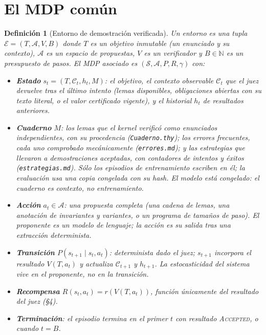 \documentclass[11pt,a4paper]{article}
\newtheorem{definition}{Definición}
\begin{document}
\section{El MDP común}

\begin{definition}[Entorno de demostración verificada]
Un entorno es una tupla $\mathcal{E} = (T, \mathcal{A}, V, B)$ donde $T$ es un \emph{objetivo} inmutable (un enunciado y su contexto), $\mathcal{A}$ es un espacio de \emph{propuestas}, $V$ es un \emph{verificador} y $B \in \mathbb{N}$ es un presupuesto de pasos. El MDP asociado es $(\mathcal{S}, \mathcal{A}, P, R, \gamma)$ con:
\begin{itemize}
  \item \textbf{Estado} $s_t = (T, \mathcal{C}_t, h_t, M)$: el objetivo, el \emph{contexto observable} $\mathcal{C}_t$ que el juez devuelve tras el último intento (lemas disponibles, obligaciones abiertas con su texto literal, o el valor certificado vigente), y el historial $h_t$ de resultados anteriores.
  \item \textbf{Cuaderno} $M$: los lemas que el kernel verificó como enunciados independientes, con su procedencia (\texttt{Cuaderno.thy}); los errores frecuentes, cada uno comprobado mecánicamente (\texttt{errores.md}); y las estrategias que llevaron a demostraciones aceptadas, con contadores de intentos y éxitos (\texttt{estrategias.md}). Sólo los episodios de entrenamiento escriben en él; la evaluación usa una copia congelada con su hash. El modelo está congelado: el cuaderno es contexto, no entrenamiento.
  \item \textbf{Acción} $a_t \in \mathcal{A}$: una propuesta completa (una cadena de lemas, una anotación de invariantes y variantes, o un programa de tamaños de paso). El proponente es un modelo de lenguaje; la acción es su salida tras una extracción determinista.
  \item \textbf{Transición} $P(s_{t+1} \mid s_t, a_t)$: determinista dado el juez; $s_{t+1}$ incorpora el resultado $V(T, a_t)$ y actualiza $\mathcal{C}_{t+1}$ y $h_{t+1}$. La estocasticidad del sistema vive en el proponente, no en la transición.
  \item \textbf{Recompensa} $R(s_t, a_t) = r(V(T, a_t))$, función únicamente del resultado del juez (§4).
  \item \textbf{Terminación}: el episodio termina en el primer $t$ con resultado \textsc{Accepted}, o cuando $t = B$.
\end{itemize}
\end{definition}
\end{document}

